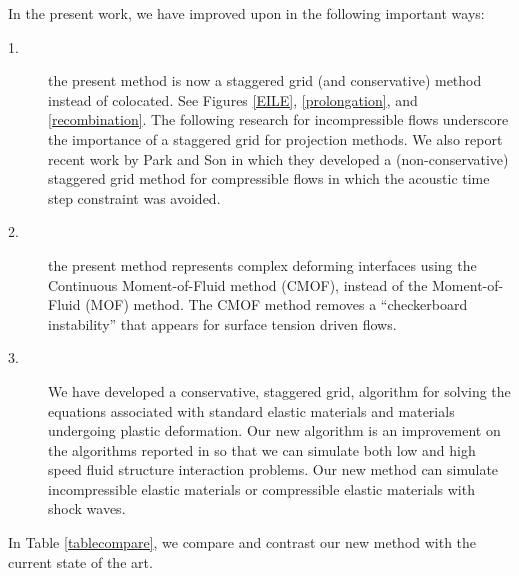 \documentclass[]{article}
\begin{document}
In the present work, we have improved upon 
\cite{jemison2014compressible}
in the following important ways:
\begin{description}
\item[1.] the present method is now a staggered grid
  (and conservative) method instead of colocated.  
  See Figures 
  \ref{EILE},
  \ref{prolongation},
  and \ref{recombination}.  
  The
  following research for incompressible flows underscore the
  importance of a staggered grid\cite{LECHENADEC2013185,
  sugiyama2011full,shin2020interaction,GUITTET2015215} for
  projection methods.  We also report recent work by
  Park and Son\cite{PARK2026132} in which they developed
  a (non-conservative) 
  staggered grid method for compressible flows in which the
  acoustic time step constraint was avoided.
\item[2.] the present method represents complex deforming interfaces
  using the Continuous Moment-of-Fluid method\cite{ye2024improved} (CMOF),
  instead of the Moment-of-Fluid (MOF) 
  method\cite{jemison2015filament,ahn2007multi,ahn2009adaptive}.
  The CMOF method\cite{ye2024improved} removes a ``checkerboard instability''
  that appears for surface tension driven flows.
\item[3.] We have developed a conservative, staggered grid, algorithm for
  solving the equations associated with standard elastic materials and
  materials undergoing plastic deformation. Our new algorithm is an 
  improvement on the algorithms reported in
  \cite{sugiyama2011full,shin2020interaction,PARK2026132} so that we can
  simulate both low and high speed fluid structure interaction problems.
  Our new method can simulate incompressible elastic materials or 
  compressible elastic materials with shock waves.
\end{description}

In Table \ref{tablecompare}, we compare and contrast our new method with
the current state of the art.
\end{document}
